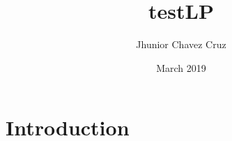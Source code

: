 \documentclass{article}
\title{testLP}
\author{Jhunior Chavez Cruz}
\date{March 2019}
\begin{document}
\maketitle

\section{Introduction}
\end{document}
